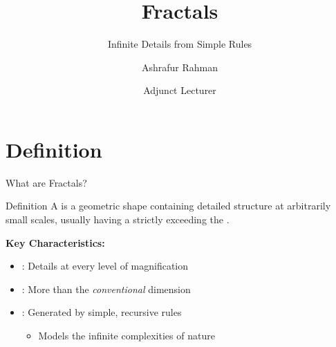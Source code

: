 

\title{Fractals}
\subtitle{Infinite Details from Simple Rules}
\author{\large Ashrafur Rahman}
\date{\small Adjunct Lecturer}



\begin{frame}
  \titlepage
\end{frame}

\section{Definition}

\begin{frame}{What are Fractals?}
  \begin{conceptbox}{Definition}
    A  is a geometric shape containing detailed structure at arbitrarily small scales,
    usually having a  strictly exceeding the .
  \end{conceptbox}

  \vspace{0.1cm}

  \textbf{Key Characteristics:}
  \begin{itemize}
    \item {}: Details at every level of magnification
    \item {}: More than the \textit{conventional} dimension
    \item {}: Generated by simple, recursive rules
      \begin{itemize}
        \item Models the infinite complexities of nature
      \end{itemize}
  \end{itemize}

  \vspace{0.1cm}

  \pause
  \begin{center}
  \end{center}
\end{frame}


